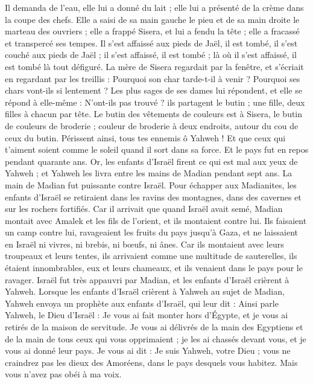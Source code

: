 \begin{multicols}{2}
Il demanda de l'eau, elle lui a donné du lait ; elle lui a présenté de la crème dans la coupe des chefs.
Elle a saisi de sa main gauche le pieu et de sa main droite le marteau des ouvriers ; elle a frappé Sisera, et lui a fendu la tête ; elle a fracassé et transpercé ses tempes.
Il s'est affaissé aux pieds de Jaël, il est tombé, il s’est couché aux pieds de Jaël ; il s'est affaissé, il est tombé ; là où il s'est affaissé, il est tombé là tout défiguré.
La mère de Sisera regardait par la fenêtre, et s'écriait en regardant par les treillis : Pourquoi son char tarde-t-il à venir ? Pourquoi ses chars vont-ils si lentement ?
Les plus sages de ses dames lui répondent, et elle se répond à elle-même :
N’ont-ils pas trouvé ? ils partagent le butin ; une fille, deux filles à chacun par tête. Le butin des vêtements de couleurs est à Sisera, le butin de couleurs de broderie ; couleur de broderie à deux endroits, autour du cou de ceux du butin.
Périssent ainsi, tous tes ennemis ô Yahweh ! Et que ceux qui t'aiment soient comme le soleil quand il sort dans sa force. Et le pays fut en repos pendant quarante ans.
\VerseOne{}Or, les enfants d'Israël firent ce qui est mal aux yeux de Yahweh ; et Yahweh les livra entre les mains de Madian pendant sept ans.
La main de Madian fut puissante contre Israël. Pour échapper aux Madianites, les enfants d'Israël se retiraient dans les ravins des montagnes, dans des cavernes et sur les rochers fortifiés.
Car il arrivait que quand Israël avait semé, Madian montait avec Amalek et les fils de l’orient, et ils montaient contre lui.
Ils faisaient un camp contre lui, ravageaient les fruits du pays jusqu'à Gaza, et ne laissaient en Israël ni vivres, ni brebis, ni bœufs, ni ânes.
Car ils montaient avec leurs troupeaux et leurs tentes, ils arrivaient comme une multitude de sauterelles, ils étaient innombrables, eux et leurs chameaux, et ils venaient dans le pays pour le ravager.
Israël fut très appauvri par Madian, et les enfants d'Israël crièrent à Yahweh.
Lorsque les enfants d'Israël crièrent à Yahweh au sujet de Madian,
Yahweh envoya un prophète aux enfants d'Israël, qui leur dit : Ainsi parle Yahweh, le Dieu d'Israël : Je vous ai fait monter hors d’Égypte, et je vous ai retirés de la maison de servitude.
Je vous ai délivrés de la main des Egyptiens et de la main de tous ceux qui vous opprimaient ; je les ai chassés devant vous, et je vous ai donné leur pays.
Je vous ai dit : Je suis Yahweh, votre Dieu ; vous ne craindrez pas les dieux des Amoréens, dans le pays desquels vous habitez. Mais vous n'avez pas obéi à ma voix.

\end{multicols}
